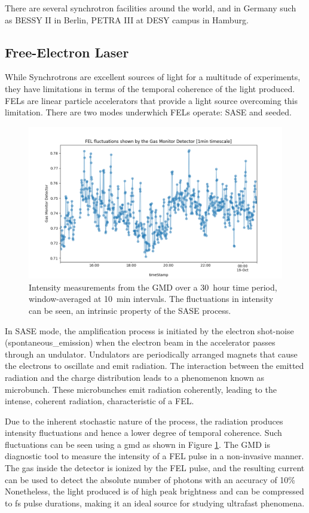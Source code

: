 There are several synchrotron facilities around the world, and in Germany such as BESSY II in Berlin, PETRA III at DESY campus in Hamburg.

\subsection{Free-Electron Laser}
While Synchrotrons are excellent sources of light for a multitude of experiments, they have limitations in terms of the temporal coherence of the light produced. \Glspl{FEL} are linear particle accelerators that provide a light source overcoming this limitation. There are two modes underwhich \glspl{FEL} operate: \gls{SASE} and seeded.


\begin{figure}
    \centering
    \includegraphics[width=0.7\linewidth]{images/2024-08-16-13-56-32.png}
    \caption{Intensity measurements from the \gls{GMD} over a \qty{30}{hour} time period, window-averaged at \qty{10}{min} intervals. The fluctuations in intensity can be seen, an intrinsic property of the \gls{SASE} process.}
    \label{fig:gmd-intensity}
\end{figure}


In \gls{SASE} mode, the amplification process is initiated by the electron shot-noise (\gls{spontaneous_emission}) when the electron beam in the accelerator passes through an undulator. Undulators are periodically arranged magnets that cause the electrons to oscillate and emit radiation. The interaction between the emitted radiation and the charge distribution leads to a phenomenon known as \gls{microbunch}. These microbunches emit radiation coherently, leading to the intense, coherent radiation, characteristic of a \gls{FEL}. 

Due to the inherent stochastic nature of the process, the radiation produces intensity fluctuations and hence a lower degree of temporal coherence. Such fluctuations can be seen using a \gls{gmd} as shown in Figure \ref{fig:gmd-intensity}. The \gls{GMD} is diagnostic tool to measure the intensity of a \gls{FEL} pulse in a non-invasive manner. The gas inside the detector is ionized by the \gls{FEL} pulse, and the resulting current can be used to detect the absolute number of photons with an accuracy of 10\% Nonetheless, the light produced is of high peak brightness and can be compressed to \unit{fs} pulse durations, making it an ideal source for studying ultrafast phenomena.

